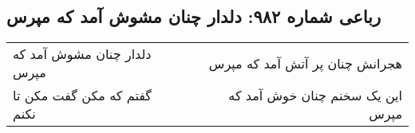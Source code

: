 \begin{center}
\section*{رباعی شماره ۹۸۲: دلدار چنان مشوش آمد که مپرس}
\label{sec:0982}
\begin{longtable}{l p{0.5cm} r}
دلدار چنان مشوش آمد که مپرس
&&
هجرانش چنان پر آتش آمد که مپرس
\\
گفتم که مکن گفت مکن تا نکنم
&&
این یک سخنم چنان خوش آمد که مپرس
\\
\end{longtable}
\end{center}
